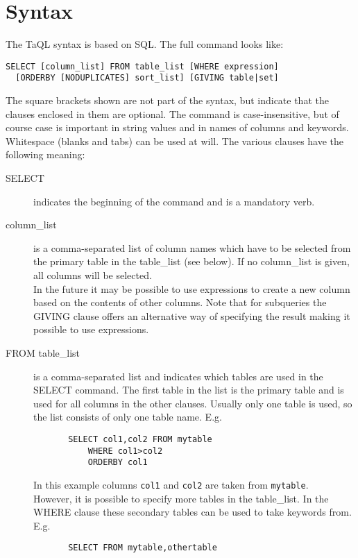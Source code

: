 \section{Syntax}
The TaQL syntax is based on SQL. The full command looks like:
\begin{verbatim}
SELECT [column_list] FROM table_list [WHERE expression]
  [ORDERBY [NODUPLICATES] sort_list] [GIVING table|set]
\end{verbatim}
The square brackets shown are not part of the syntax, but indicate
that the clauses enclosed in them are optional. The command is
case-insensitive, but of course case is important in string values and
in names of columns and keywords. Whitespace (blanks and tabs) can
be used at will.
The various clauses have the following meaning:
\begin{description}
  \item[ SELECT ]
       indicates the beginning of the command and is a mandatory verb.
  \item[ column\_list]
       is a comma-separated list of column names which have to be selected
       from the primary table in the table\_list (see below).
       If no column\_list is given, all columns will be selected.
       \\In the future it may be possible to use expressions to create
       a new column based on the contents of other columns.
       Note that for subqueries the GIVING clause offers an
       alternative way of specifying the result making it
       possible to use expressions.
  \item[ \label{TAQL:TABLE_LIST}FROM table\_list ]
       is a comma-separated list and indicates which tables are used in
       the SELECT command. The first table in the list is the primary
       table and is used for all columns in the other clauses.
       Usually only one table is used, so the list consists of only one
       table name. E.g.
       \begin{verbatim}
       SELECT col1,col2 FROM mytable
           WHERE col1>col2
           ORDERBY col1
       \end{verbatim}
       In this example columns \texttt{col1} and \texttt{col2}
       are taken from \texttt{mytable}.
       \\However, it is possible to specify more tables in the table\_list.
       In the WHERE clause these secondary tables can be used to take
       keywords from. E.g.
       \begin{verbatim}
       SELECT FROM mytable,othertable

\end{verbatim}
\end{description}
